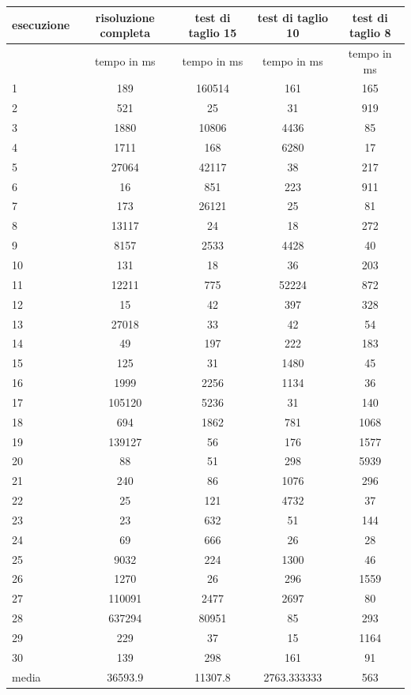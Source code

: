 	\begin{tabular}{|l|c|c|c|c|}
	\hline
	esecuzione      & risoluzione completa	& test di taglio 15	& test di taglio 10	& test di taglio 8 \\
	\hline
		&	tempo in ms	&	tempo in ms	&	tempo in ms	&	tempo in ms\\
	\hline
	1	&	189	&	160514	&	161	&	165\\
	2	&	521	&	25	&	31	&	919\\
	3	&	1880	&	10806	&	4436	&	85\\
	4	&	1711	&	168	&	6280	&	17\\
	5	&	27064	&	42117	&	38	&	217\\
	6	&	16	&	851	&	223	&	911\\
	7	&	173	&	26121	&	25	&	81\\
	8	&	13117	&	24	&	18	&	272\\
	9	&	8157	&	2533	&	4428	&	40\\
	10	&	131	&	18	&	36	&	203\\
	11	&	12211	&	775	&	52224	&	872\\
	12	&	15	&	42	&	397	&	328\\
	13	&	27018	&	33	&	42	&	54\\
	14	&	49	&	197	&	222	&	183\\
	15	&	125	&	31	&	1480	&	45\\
	16	&	1999	&	2256	&	1134	&	36\\
	17	&	105120	&	5236	&	31	&	140\\
	18	&	694	&	1862	&	781	&	1068\\
	19	&	139127	&	56	&	176	&	1577\\
	20	&	88	&	51	&	298	&	5939\\
	21	&	240	&	86	&	1076	&	296\\
	22	&	25	&	121	&	4732	&	37\\
	23	&	23	&	632	&	51	&	144\\
	24	&	69	&	666	&	26	&	28\\
	25	&	9032	&	224	&	1300	&	46\\
	26	&	1270	&	26	&	296	&	1559\\
	27	&	110091	&	2477	&	2697	&	80\\
	28	&	637294	&	80951	&	85	&	293\\
	29	&	229	&	37	&	15	&	1164\\
	30	&	139	&	298	&	161	&	91\\
	\hline
	media	&	36593.9	&	11307.8	&	2763.333333	&	563\\
	\hline
	\end{tabular}
	
